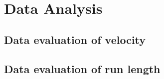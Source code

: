 \section{Data Analysis}
\subsection{Data evaluation of velocity}
\subsection{Data evaluation of run length}